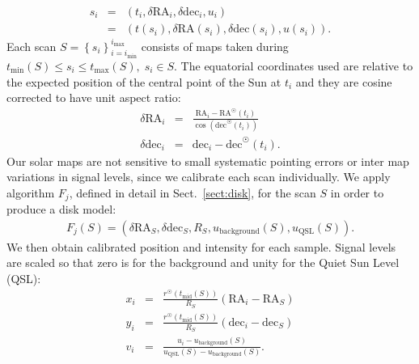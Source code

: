 \documentclass{aa}
\newcommand{\eqnl}[2]{\begin{eqnarray}\label{#1}#2\end{eqnarray}}
\newcommand{\s}[2]{{#1}_{\mathrm{#2}}}
\begin{document}
\eqnl{radio_sample}{
s_i &=& 
\left( t_i, \delta \mathrm{RA}_i, \delta \mathrm{dec}_i, u_i \right) \\ \nonumber
&=& \left( t(s_i), \delta \mathrm{RA}(s_i), \delta \mathrm{dec}(s_i), u(s_i) \right) \text{.}
}
Each scan $S = \left\{ s_i \right\}_{i=\s{i}{min}}^{\s{i}{max}}$ consists of maps taken 
during $\s{t}{min}(S) \le s_i \le \s{t}{max}(S), \; s_i \in S$.
The equatorial coordinates used are relative to the expected position of the central point
of the Sun at $t_i$ and they are cosine corrected to have unit aspect ratio:
\eqnl{relative_radec}{
\delta \mathrm{RA}_i  &=& \frac{\mathrm{RA}_i - \mathrm{RA}^{\astrosun}(t_i)}{\cos \left( \mathrm{dec}^{\astrosun}(t_i) \right)} \\
\delta \mathrm{dec}_i &=& \mathrm{dec}_i - \mathrm{dec}^{\astrosun}(t_i) \text{.}
}
Our solar maps are not sensitive to small systematic pointing errors or inter map variations in signal levels, since we calibrate each scan individually.
We apply algorithm $F_j$,
defined in detail in Sect.~\ref{sect:disk},
for the scan $S$ in order to produce a disk model:
\eqnl{disk_model}{
F_j(S) = \left( \delta \mathrm{RA}_S, \delta \mathrm{dec}_S, R_S, \s{u}{background}(S), \s{u}{QSL}(S) \right) \text{.}
}
We then obtain calibrated position and intensity for each sample. Signal levels are scaled so that zero is for the background and unity for the Quiet Sun Level (QSL):
\eqnl{calibration}{
x_i &=& \frac{r^{\astrosun} \left( \s{t}{mid}(S) \right)}{R_S} \left( \mathrm{RA}_i -  \mathrm{RA}_S  \right) \\
y_i &=& \frac{r^{\astrosun} \left( \s{t}{mid}(S) \right)}{R_S} \left( \mathrm{dec}_i - \mathrm{dec}_S \right) \\
v_i &=& \frac{u_i - \s{u}{background}(S)}{\s{u}{QSL}(S) - \s{u}{background}(S)} \text{.}
}
\end{document}
